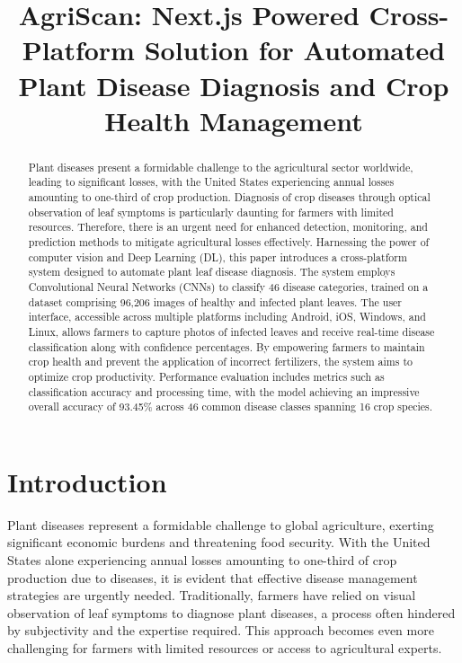 \documentclass{article}
\title{AgriScan: Next.js Powered Cross-Platform Solution for Automated Plant Disease Diagnosis and Crop Health Management}
\date{}
\begin{document}
\maketitle

\begin{abstract}
Plant diseases present a formidable challenge to the agricultural sector worldwide, leading to significant losses, with the United States experiencing annual losses amounting to one-third of crop production. Diagnosis of crop diseases through optical observation of leaf symptoms is particularly daunting for farmers with limited resources. Therefore, there is an urgent need for enhanced detection, monitoring, and prediction methods to mitigate agricultural losses effectively. Harnessing the power of computer vision and Deep Learning (DL), this paper introduces a cross-platform system designed to automate plant leaf disease diagnosis. The system employs Convolutional Neural Networks (CNNs) to classify 46 disease categories, trained on a dataset comprising 96,206 images of healthy and infected plant leaves. The user interface, accessible across multiple platforms including Android, iOS, Windows, and Linux, allows farmers to capture photos of infected leaves and receive real-time disease classification along with confidence percentages. By empowering farmers to maintain crop health and prevent the application of incorrect fertilizers, the system aims to optimize crop productivity. Performance evaluation includes metrics such as classification accuracy and processing time, with the model achieving an impressive overall accuracy of 93.45\% across 46 common disease classes spanning 16 crop species.
\end{abstract}

\section{Introduction}

Plant diseases represent a formidable challenge to global agriculture, exerting significant economic burdens and threatening food security. With the United States alone experiencing annual losses amounting to one-third of crop production due to diseases, it is evident that effective disease management strategies are urgently needed. Traditionally, farmers have relied on visual observation of leaf symptoms to diagnose plant diseases, a process often hindered by subjectivity and the expertise required. This approach becomes even more challenging for farmers with limited resources or access to agricultural experts.
\end{document}
